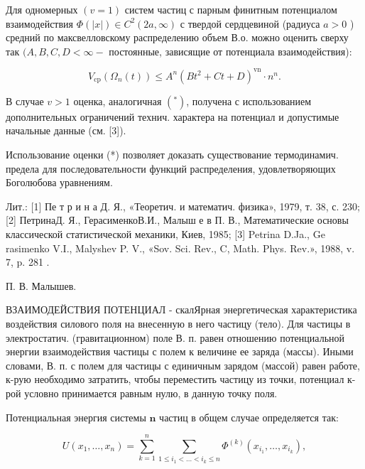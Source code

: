 \documentclass[10pt]{article}
\begin{document}
Для одномерных $(v=1)$ систем частиц с парным финитным потенциалом взаимодействия $\Phi(|x|) \in C^{2}(2 a, \infty)$ с твердой сердцевиной (радиуса $a>0$ ) средний по максвелловскому распределению объем В.о. можно оценить сверху так $(A, B, C, D<\infty-$ постоянные, зависящие от потенциала взаимодействия):



\[

V_{\mathrm{cp}}\left(\Omega_{n}(t)\right) \leqslant A^{n}\left(B t^{2}+C t+D\right)^{\mathrm{vn}} \cdot n^{n} .

\]



В случае $v>1$ оценка, аналогичная $\left({ }^{*}\right)$, получена с использованием дополнительных ограничений технич. характера на потенциал и допустимые начальные данные (см. [3]).



Использование оценки (*) позволяет доказать существование термодинамич. предела для последовательности функций распределения, удовлетворяющих Боголюбова уравнениям.



Лит.: [1] Пе т р и н а Д. Я., «Теоретич. и математич. физика», 1979, т. 38, с. 230; [2] ПетринаД. Я., ГерасименкоВ.И., Малыш е в П. В., Математические основы классической статистической механики, Киев, 1985; [3] Petrina D.Ja., Ge rasimenko V.I., Malyshev P. V., «Sov. Sci. Rev., C, Math. Phys. Rev.», 1988, v. 7, p. 281 .



П. В. Малышев.



ВЗАИМОДЕЙСТВИЯ ПОТЕНЦИАЛ - скалЯрная энергетическая характеристика воздействия силового поля на внесенную в него частицу (тело). Для частицы в электростатич. (гравитационном) поле В. п. равен отношению потенциальной энергии взаимодействия частицы с полем к величине ее заряда (массы). Иными словами, В. п. с полем для частицы с единичным зарядом (массой) равен работе, к-рую необходимо затратить, чтобы переместить частицу из точки, потенциал к-рой условно принимается равным нулю, в данную точку поля.



Потенциальная энергия системы $\boldsymbol{n}$ частиц в общем случае определяется так:



\[

U\left(x_{1}, \ldots, x_{n}\right)=\sum_{k=1}^{n} \sum_{1 \leqslant i_{1}<\ldots<i_{k} \leqslant n} \Phi^{(k)}\left(x_{i_{1}}, \ldots, x_{i_{k}}\right),

\]
\end{document}
